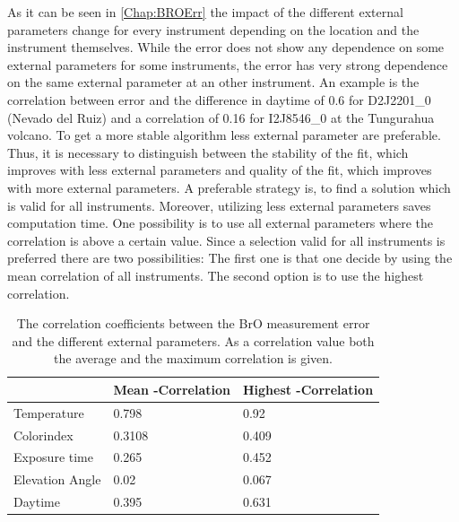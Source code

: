 \documentclass  [
  paper    = a4,
  BCOR     = 10mm,
  twoside,
  fontsize = 12pt,
  fleqn,
  toc      = bibnumbered,
  toc      = listofnumbered,
  numbers  = noendperiod,
  headings = normal,
  listof   = leveldown,
  version  = 3.03
]                                       {scrreprt}
\begin{document}
	As it can be seen in \cref{Chap:BROErr} the impact of the different external parameters change for every instrument depending on the location and the instrument themselves. 
	While the   error does not show any dependence on some external parameters for some instruments, the error has very strong dependence on the same external parameter at an other instrument. An example is the correlation between   error and the difference in daytime of 0.6 for D2J2201\_0 (Nevado del Ruiz) and a correlation of 0.16 for I2J8546\_0 at the Tungurahua volcano.
	To get a more stable algorithm less external parameter are preferable. Thus, it is necessary to distinguish between the stability of the fit, which improves with less external parameters and quality of the fit, which improves with more external parameters. 
	A preferable strategy is, to find a solution which is valid for all instruments. Moreover, utilizing less external parameters saves computation time.
	One possibility is to use all external parameters where the correlation is above a certain value. Since a selection valid for all instruments is preferred there are two possibilities: The first one is that one decide by using the mean correlation of all instruments. The second option is to use the highest correlation.
	
	\begin{table}[h]
		\centering
		\begin{tabular}{|p{4cm}|p{3cm}|p{3cm}|}
			&  Mean -Correlation&  Highest   -Correlation\\
			\toprule
			Temperature &0.798&	0.92\\
			\midrule
			Colorindex &0.3108&	0.409\\
			\midrule
			Exposure time &0.265&	0.452\\
			\midrule
			Elevation Angle &0.02&	0.067\\
			\midrule
			Daytime &0.395&	0.631\\
			\bottomrule		
		\end{tabular}
	\label{tab:CorrEP}
	\caption{The correlation coefficients between the BrO measurement error and the different external parameters. As a correlation value both the average and the maximum correlation is given.}
	\end{table}
\end{document}
